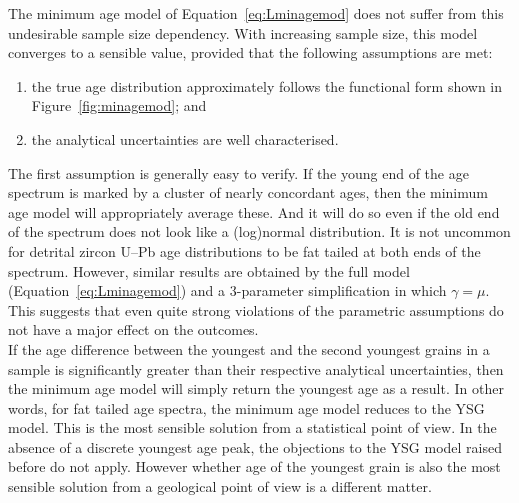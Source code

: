 \begin{refsection}
The minimum age model of Equation~\ref{eq:Lminagemod} does not suffer
from this undesirable sample size dependency. With increasing sample
size, this model converges to a sensible value, provided that the
following assumptions are met:

\begin{enumerate}
\item the true age distribution approximately follows the functional
  form shown in Figure~\ref{fig:minagemod}; and
\item the analytical uncertainties are well characterised.
\end{enumerate}

The first assumption is generally easy to verify. If the young end of
the age spectrum is marked by a cluster of nearly concordant ages,
then the minimum age model will appropriately average these. And it
will do so even if the old end of the spectrum does not look like a
(log)normal distribution. It is not uncommon for detrital zircon U--Pb
age distributions to be fat tailed at both ends of the
spectrum. However, similar results are obtained by the full model
(Equation~\ref{eq:Lminagemod}) and a 3-parameter simplification in
which $\gamma=\mu$. This suggests that even quite strong violations of
the parametric assumptions do not have a major effect on the
outcomes.\\

If the age difference between the youngest and the second youngest
grains in a sample is significantly greater than their respective
analytical uncertainties, then the minimum age model will simply
return the youngest age as a result. In other words, for fat tailed
age spectra, the minimum age model reduces to the YSG model. This is
the most sensible solution from a statistical point of view. In the
absence of a discrete youngest age peak, the objections to the YSG
model raised before do not apply. However whether age of the youngest
grain is also the most sensible solution from a geological point of
view is a different matter.


\end{refsection}
